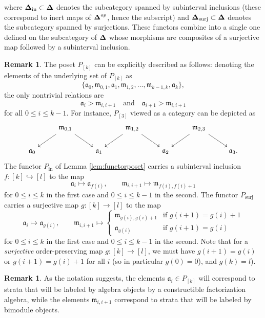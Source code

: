 \documentclass[10pt, reqno, twoside
, final
]{amsart}
\numberwithin{equation}{subsection}%
\theoremstyle{definition}
\theoremstyle{definition}
\theoremstyle{definition}
\theoremstyle{definition}
\theoremstyle{definition}
\theoremstyle{definition}
\theoremstyle{definition}
\theoremstyle{definition}
\theoremstyle{definition}
\theoremstyle{plain}
\theoremstyle{definition}
\theoremstyle{plain}
\theoremstyle{definition}
\theoremstyle{plain}
\theoremstyle{definition}
\newtheorem{rmk}[defn]{Remark}
\theoremstyle{definition}
\theoremstyle{plain}
\theoremstyle{plain}
\theoremstyle{definition}
\theoremstyle{plain}
\theoremstyle{plain}
\theoremstyle{plain}
\begin{document}
where $\boldsymbol{\Delta}_{\mathrm{in}}\subset \boldsymbol{\Delta}$ denotes the subcategory spanned by subinterval inclusions (these correspond to inert maps of $\boldsymbol{\Delta}^{op}$, hence the subscript) and $\boldsymbol{\Delta}_{\mathrm{surj}}\subset \boldsymbol{\Delta}$ denotes the subcategory spanned by surjections. These functors combine into a single one defined on the subcategory of $\boldsymbol{\Delta}$ whose morphisms are composites of a surjective map followed by a subinterval inclusion.
\begin{rmk}
The poset $P_{[k]}$ can be explicitly described as follows: denoting the elements of the underlying set of $P_{[k]}$ as
\[ \{\mathfrak{a}_0,\mathfrak{m}_{0,1}, \mathfrak{a}_1,\mathfrak{m}_{1,2},\ldots,\mathfrak{m}_{k-1,k},\mathfrak{a}_k\},\]
the only nontrivial relations are 
\[  \mathfrak{a}_i>\mathfrak{m}_{i,i+1} \quad\text{and}\quad \mathfrak{a}_{i+1}> \mathfrak{m}_{i,i+1} \]
for all $0\leq i\leq k-1$. For instance, $P_{[3]}$ viewed as a category can be depicted as 
\[
\begin{tikzcd}
& \mathfrak{m}_{0,1} \ar[dr]\ar[dl] &&   \mathfrak{m}_{1,2} \ar[dr]\ar[dl]   && \mathfrak{m}_{2,3} \ar[dr]\ar[dl]   \\
\mathfrak{a}_0 &&\mathfrak{a}_1 &&\mathfrak{a}_2 &&\mathfrak{a}_3. 
\end{tikzcd}
\]
 The functor $P_{\mathrm{in}}$ of Lemma \ref{lem:functorposet} carries a subinterval inclusion $f:[k]\hookrightarrow [l]$ to the map 
\begin{equation*}\label{eq:posetfunctor}
\mathfrak{a}_i\longmapsto \mathfrak{a}_{f(i)},\quad \quad \mathfrak{m}_{i,i+1}\longmapsto \mathfrak{m}_{f(i),f(i)+1}
\end{equation*}  
for $0\leq i\leq k$ in the first case and $0\leq i\leq k-1$ in the second. The functor $P_{\mathrm{surj}}$ carries a surjective map $g:[k]\rightarrow [l]$ to the map 
\begin{equation*}\label{eq:posetfunctor2}
\mathfrak{a}_i\longmapsto \mathfrak{a}_{g(i)},\quad \quad \mathfrak{m}_{i,i+1}\longmapsto \begin{cases}
   \mathfrak{m}_{g(i),g(i)+1}& \text{if } g(i+1)=g(i)+1 \\
    \mathfrak{a}_{g(i)} & \text{if } g(i+1)=g(i) 
\end{cases}
\end{equation*} 
for $0\leq i\leq k$ in the first case and $0\leq i\leq k-1$ in the second. Note that for a \emph{surjective} order-preserving map $g:[k]\rightarrow [l]$, we must have $g(i+1)=g(i)$ or $g(i+1)=g(i)+1$ for all $i$ (so in particular $g(0)=0$), and $g(k)=l$). 
\end{rmk}
\begin{rmk}
As the notation suggests, the elements $\mathfrak{a}_i\in P_{[k]}$ will correspond to strata that will be labeled by algebra objects by a constructible factorization algebra, while the elements $\mathfrak{m}_{i,i+1}$ correspond to strata that will be labeled by bimodule objects.
\end{rmk}
\end{document}
